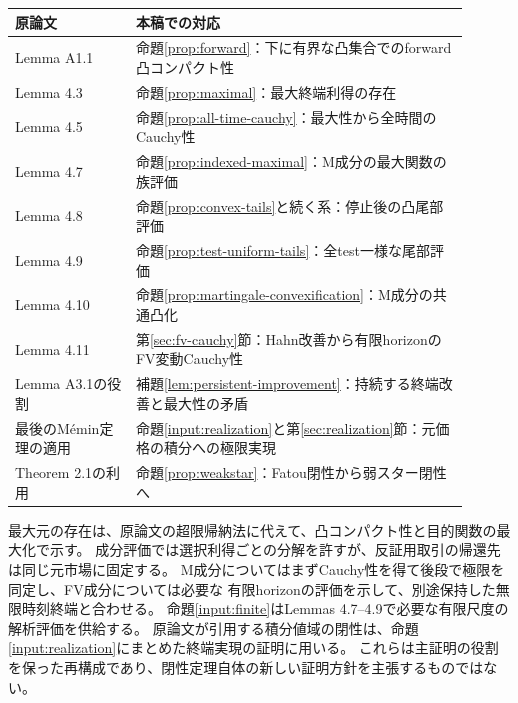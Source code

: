 \begin{center}
\small
\begin{tabular}{L{0.24\linewidth}L{0.66\linewidth}}
\toprule
原論文 & 本稿での対応 \\
\midrule
Lemma A1.1 & 命題\ref{prop:forward}：下に有界な凸集合でのforward凸コンパクト性 \\
Lemma 4.3 & 命題\ref{prop:maximal}：最大終端利得の存在 \\
Lemma 4.5 & 命題\ref{prop:all-time-cauchy}：最大性から全時間のCauchy性 \\
Lemma 4.7 & 命題\ref{prop:indexed-maximal}：M成分の最大関数の族評価 \\
Lemma 4.8 & 命題\ref{prop:convex-tails}と続く系：停止後の凸尾部評価 \\
Lemma 4.9 & 命題\ref{prop:test-uniform-tails}：全test一様な尾部評価 \\
Lemma 4.10 & 命題\ref{prop:martingale-convexification}：M成分の共通凸化 \\
Lemma 4.11 & 第\ref{sec:fv-cauchy}節：Hahn改善から有限horizonのFV変動Cauchy性 \\
Lemma A3.1の役割 & 補題\ref{lem:persistent-improvement}：持続する終端改善と最大性の矛盾 \\
最後のM\'emin定理の適用 & 命題\ref{input:realization}と第\ref{sec:realization}節：元価格の積分への極限実現 \\
Theorem 2.1の利用 & 命題\ref{prop:weakstar}：Fatou閉性から弱スター閉性へ \\
\bottomrule
\end{tabular}
\end{center}

最大元の存在は、原論文の超限帰納法に代えて、凸コンパクト性と目的関数の最大化で示す。
成分評価では選択利得ごとの分解を許すが、反証用取引の帰還先は同じ元市場に固定する。
M成分についてはまずCauchy性を得て後段で極限を同定し、FV成分については必要な
有限horizonの評価を示して、別途保持した無限時刻終端と合わせる。
命題\ref{input:finite}はLemmas 4.7--4.9で必要な有限尺度の解析評価を供給する。
原論文が引用する積分値域の閉性は、命題\ref{input:realization}にまとめた終端実現の証明に用いる。
これらは主証明の役割を保った再構成であり、閉性定理自体の新しい証明方針を主張するものではない。

